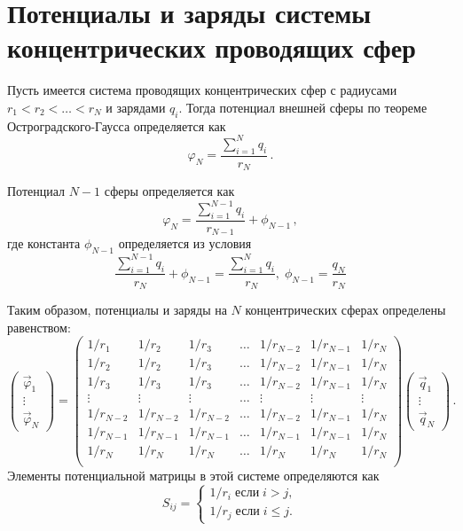 \documentclass[12pt,a4paper]{report}
\begin{document}
\section{Потенциалы и заряды системы концентрических проводящих сфер}

Пусть имеется система проводящих концентрических сфер с радиусами 
$r_1<r_2<\dots<r_N$ и зарядами $q_i$. Тогда потенциал внешней сферы по теореме 
Остроградского-Гаусса определяется как
\begin{equation}
  \varphi_N=\frac{\sum\limits_{i=1}^Nq_i}{r_N}\,.
\end{equation}

Потенциал $N-1$ сферы определяется как
\begin{equation}
  \varphi_N=\frac{\sum\limits_{i=1}^{N-1}q_i}{r_{N-1}}+\phi_{N-1}\,,
\end{equation}
где константа $\phi_{N-1}$ определяется из условия
\begin{equation}
 \frac{\sum\limits_{i=1}^{N-1}q_i}{r_{N}}+\phi_{N-1}=
 \frac{\sum\limits_{i=1}^Nq_i}{r_N},\;
  \phi_{N-1}=\frac{q_N}{r_N}
\end{equation}

Таким образом, потенциалы и заряды на $N$ концентрических сферах определены 
равенством:
\begin{equation}
  \left(
  \begin{array}{c}
    \vec \varphi_1\\
    \vdots\\
    \vec \varphi_N
  \end{array}
  \right)=
  \left(
  \begin{array}{ccccccc}
1/r_1 & 1/r_2 & 1/r_3 & \ldots & 1/r_{N-2} & 1/r_{N-1} & 1/r_N\\
1/r_2 & 1/r_2 & 1/r_3 & \ldots & 1/r_{N-2} & 1/r_{N-1} & 1/r_N\\
1/r_3 & 1/r_3 & 1/r_3 & \ldots & 1/r_{N-2} & 1/r_{N-1} & 1/r_N\\
\vdots & \vdots & \vdots & \ldots & \vdots & \vdots & \vdots\\
1/r_{N-2} & 1/r_{N-2} & 1/r_{N-2} & \ldots & 1/r_{N-2} & 1/r_{N-1} & 1/r_N\\
1/r_{N-1} & 1/r_{N-1} & 1/r_{N-1} & \ldots & 1/r_{N-1} & 1/r_{N-1} & 1/r_N\\    
1/r_N & 1/r_N & 1/r_N & \ldots & 1/r_N & 1/r_N & 1/r_N\\
  \end{array}
  \right)
  \left(
  \begin{array}{c}
    \vec q_1\\
    \vdots\\
    \vec q_N
  \end{array}
  \right)\,.
\end{equation}
Элементы потенциальной матрицы в этой системе определяются как
\begin{equation}
  S_{ij}=
  \left\{
  \begin{array}{c}
    1/r_i\;\mbox{если}\;i>j,\\
    1/r_j\;\mbox{если}\;i\le j.
  \end{array}
  \right.
\end{equation}
\end{document}
